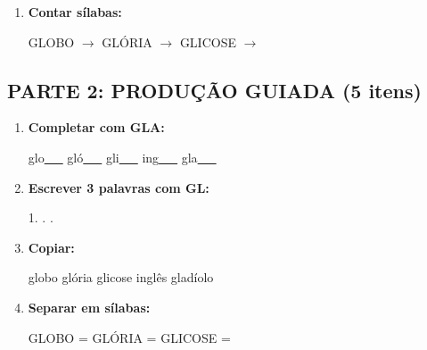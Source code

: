 \begin{exercicio}
\begin{enumerate}
  \item \textbf{Contar sílabas:}
  \begin{center}
  GLOBO $\rightarrow$ \underline{\hspace{0.9cm}} \quad GLÓRIA $\rightarrow$ \underline{\hspace{0.9cm}} \quad GLICOSE $\rightarrow$ \underline{\hspace{0.9cm}}
  \end{center}

\end{enumerate}

\subsection*{PARTE 2: PRODUÇÃO GUIADA (5 itens)}

\begin{enumerate}[resume]

  \item \textbf{Completar com GLA:}
  \begin{center}
  glo\underline{~~~} \quad gló\underline{~~~} \quad gli\underline{~~~} \quad ing\underline{~~~} \quad gla\underline{~~~}
  \end{center}

  \item \textbf{Escrever 3 palavras com GL:}
  \begin{center}
  1. \underline{\hspace{3cm}} . \underline{\hspace{3cm}} . \underline{\hspace{3cm}}
  \end{center}

  \item \textbf{Copiar:}
  \begin{center}
  globo \quad glória \quad glicose \quad inglês \quad gladíolo
  \end{center}

  \item \textbf{Separar em sílabas:}
  \begin{center}
  GLOBO = \underline{\hspace{1cm}} \underline{\hspace{1cm}} \quad GLÓRIA = \underline{\hspace{1cm}} \underline{\hspace{1cm}} \quad GLICOSE = \underline{\hspace{1cm}} \underline{\hspace{1cm}}
  \end{center}


\end{enumerate}
\end{exercicio}
